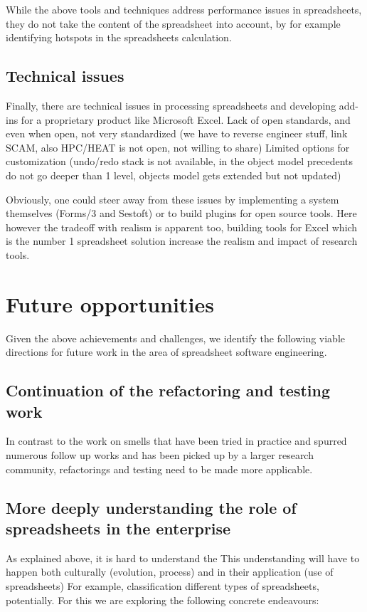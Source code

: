 \documentclass[conference]{IEEEtran}
\begin{document}
While the above tools and techniques address performance issues in spreadsheets, they do not take the content of the spreadsheet into account, by for example identifying hotspots in the spreadsheets calculation. 

\subsection{Technical issues} 
Finally, there are technical issues in processing spreadsheets and developing add-ins for a proprietary product like Microsoft Excel. 
Lack of open standards, and even when open, not very standardized (we have to reverse engineer stuff, link SCAM, also HPC/HEAT is not open, not willing to share)
Limited options for customization (undo/redo stack is not available, in the object model precedents do not go deeper than 1 level, objects model gets extended but not updated)

Obviously, one could steer away from these issues by implementing a system themselves (Forms/3 and Sestoft) or to build plugins for open source tools. Here however the tradeoff with realism is apparent too, building tools for Excel which is the number 1 spreadsheet solution increase the realism and impact of research tools.

\section{Future opportunities}
Given the above achievements  and challenges, we identify the following viable directions for future work in the area of spreadsheet software engineering.

\subsection{Continuation of the refactoring and testing work}
In contrast to the work on smells that have been tried in practice and spurred numerous follow up works and has been picked up by a larger research community, refactorings and testing need to be made more applicable.

\subsection{More deeply understanding the role of spreadsheets in the enterprise}
As explained above, it is hard to understand the 
This understanding will have to happen both culturally (evolution, process) and in their application (use of spreadsheets) For example, classification different types of spreadsheets, potentially. For this we are exploring the following concrete endeavours:
\end{document}
